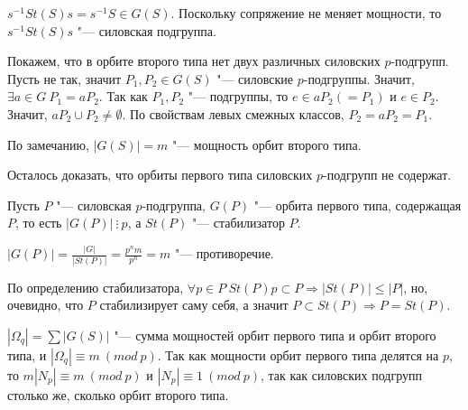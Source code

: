 \documentclass{article}
\begin{document}
$s^{-1}St(S)s = s^{-1}S \in G(S)$. Поскольку сопряжение не меняет мощности, то $s^{-1}St(S)s$ "--- силовская подгруппа.

Покажем, что в орбите второго типа нет двух различных силовских $p$-подгрупп. Пусть не так, значит $P_1, P_2 \in G(S)$ "--- силовские $p$-подгруппы. Значит, $\exists a \in G \  P_1 = aP_2$. Так как $P_1, P_2$ "--- подгруппы, то $e \in aP_2 (= P_1)$ и $e \in P_2$. Значит, $aP_2 \cup P_2 \neq \emptyset$. По свойствам левых смежных классов, $P_2 = aP_2 = P_1$.

По замечанию, $|G(S)| = m$ "--- мощность орбит второго типа. 

Осталось доказать, что орбиты первого типа силовских $p$-подгрупп не содержат.

Пусть $P$ "--- силовская $p$-подгруппа, $G(P)$ "--- орбита первого типа, содержащая $P$, то есть $|G(P)|\ \vdots \  p$, а $St(P)$ "--- стабилизатор $P$.

$|G(P)| = \frac{|G|}{|St(P)|} = \frac{p^nm}{p^n} = m$ "--- противоречие.

По определению стабилизатора, $\forall p \in P \  St(P)p \subset P \Rightarrow |St(P)| \leq |P|$, но, очевидно, что $P$ стабилизирует саму себя, а значит $P \subset St(P) \Rightarrow P = St(P)$.

$|\Omega_q| = \sum |G(S)|$ "--- сумма мощностей орбит первого типа и орбит второго типа, и $|\Omega_q| \equiv m \  (mod \  p)$. Так как мощности орбит первого типа делятся на $p$, то $m|N_p| \equiv m \ (mod \  p)$ и $|N_p| \equiv 1 \  (mod \  p)$, так как силовских подгрупп столько же, сколько орбит второго типа.
\end{document}
